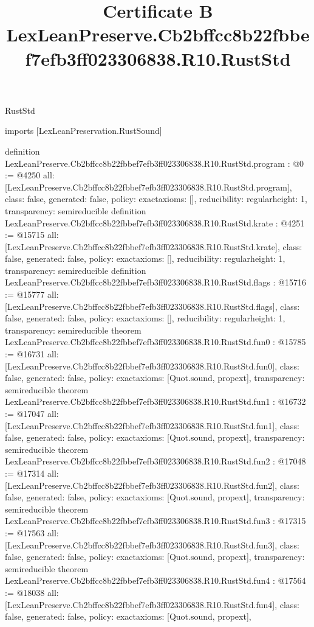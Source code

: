 \begin{lexlean}{RustStd}
\title{Certificate B LexLeanPreserve.Cb2bffcc8b22fbbef7efb3ff023306838.R10.RustStd}
\begin{coremodule}
imports [LexLeanPreservation.RustSound]

definition LexLeanPreserve.Cb2bffcc8b22fbbef7efb3ff023306838.R10.RustStd.program : @0 := @4250 {
  all: [LexLeanPreserve.Cb2bffcc8b22fbbef7efb3ff023306838.R10.RustStd.program],
  class: false,
  generated: false,
  policy: exact{axioms: []},
  reducibility: regular{height: 1},
  transparency: semireducible
}
definition LexLeanPreserve.Cb2bffcc8b22fbbef7efb3ff023306838.R10.RustStd.krate : @4251 := @15715 {
  all: [LexLeanPreserve.Cb2bffcc8b22fbbef7efb3ff023306838.R10.RustStd.krate],
  class: false,
  generated: false,
  policy: exact{axioms: []},
  reducibility: regular{height: 1},
  transparency: semireducible
}
definition LexLeanPreserve.Cb2bffcc8b22fbbef7efb3ff023306838.R10.RustStd.flags : @15716 := @15777 {
  all: [LexLeanPreserve.Cb2bffcc8b22fbbef7efb3ff023306838.R10.RustStd.flags],
  class: false,
  generated: false,
  policy: exact{axioms: []},
  reducibility: regular{height: 1},
  transparency: semireducible
}
theorem LexLeanPreserve.Cb2bffcc8b22fbbef7efb3ff023306838.R10.RustStd.fun0 : @15785 := @16731 {
  all: [LexLeanPreserve.Cb2bffcc8b22fbbef7efb3ff023306838.R10.RustStd.fun0],
  class: false,
  generated: false,
  policy: exact{axioms: [Quot.sound, propext]},
  transparency: semireducible
}
theorem LexLeanPreserve.Cb2bffcc8b22fbbef7efb3ff023306838.R10.RustStd.fun1 : @16732 := @17047 {
  all: [LexLeanPreserve.Cb2bffcc8b22fbbef7efb3ff023306838.R10.RustStd.fun1],
  class: false,
  generated: false,
  policy: exact{axioms: [Quot.sound, propext]},
  transparency: semireducible
}
theorem LexLeanPreserve.Cb2bffcc8b22fbbef7efb3ff023306838.R10.RustStd.fun2 : @17048 := @17314 {
  all: [LexLeanPreserve.Cb2bffcc8b22fbbef7efb3ff023306838.R10.RustStd.fun2],
  class: false,
  generated: false,
  policy: exact{axioms: [Quot.sound, propext]},
  transparency: semireducible
}
theorem LexLeanPreserve.Cb2bffcc8b22fbbef7efb3ff023306838.R10.RustStd.fun3 : @17315 := @17563 {
  all: [LexLeanPreserve.Cb2bffcc8b22fbbef7efb3ff023306838.R10.RustStd.fun3],
  class: false,
  generated: false,
  policy: exact{axioms: [Quot.sound, propext]},
  transparency: semireducible
}
theorem LexLeanPreserve.Cb2bffcc8b22fbbef7efb3ff023306838.R10.RustStd.fun4 : @17564 := @18038 {
  all: [LexLeanPreserve.Cb2bffcc8b22fbbef7efb3ff023306838.R10.RustStd.fun4],
  class: false,
  generated: false,
  policy: exact{axioms: [Quot.sound, propext]},
}
\end{coremodule}
\end{lexlean}
